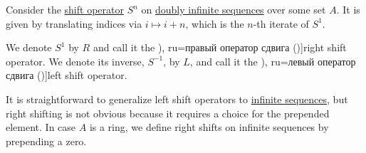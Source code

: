 \begin{definition}\label{def:sequence_shift_operator}
  Consider the \hyperref[def:shift_operator]{shift operator} \( S^n \) on \hyperref[def:doubly_infinite_sequence]{doubly infinite sequences} over some set \( A \). It is given by translating indices via \( i \mapsto i + n \), which is the \( n \)-th iterate of \( S^1 \).

  We denote \( S^1 \) by \( R \) and call it the \term[en=right shift operator (\cite[exerc. 7.26]{FabianEtAl2001FunctionalAnalysis}), ru=правый оператор сдвига (\cite[example 1.3.3]{Хелемский2014ФункциональныйАнализ})]{right shift operator}. We denote its inverse, \( S^{-1} \), by \( L \), and call it the \term[en=left shift operator (\cite[exerc. 7.26]{FabianEtAl2001FunctionalAnalysis}), ru=левый оператор сдвига (\cite[example 1.3.3]{Хелемский2014ФункциональныйАнализ})]{left shift operator}.

  It is straightforward to generalize left shift operators to \hyperref[def:sequence]{infinite sequences}, but right shifting is not obvious because it requires a choice for the prepended element. In case \( A \) is a ring, we define right shifts on infinite sequences by prepending a zero.
\end{definition}
